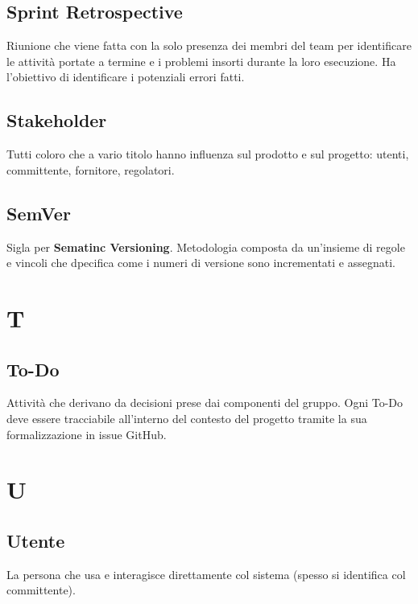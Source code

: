 \documentclass[a4paper,12pt]{article}
\begin{document}
\subsection*{Sprint Retrospective}
Riunione che viene fatta con la solo presenza dei membri del team per identificare le attività portate a termine e i problemi insorti durante la loro esecuzione.
Ha l'obiettivo di identificare i potenziali errori fatti.

\subsection*{Stakeholder}
Tutti coloro che a vario titolo hanno influenza sul prodotto e sul progetto: utenti, committente, fornitore, regolatori.

\subsection*{SemVer}
Sigla per \textbf{Sematinc Versioning}. Metodologia composta da un'insieme di regole e vincoli che dpecifica come i numeri di versione sono incrementati e assegnati.

\clearpage

\section{T}

\subsection*{To-Do}
Attività che derivano da decisioni prese dai componenti del gruppo. Ogni To-Do deve essere tracciabile all'interno del contesto del progetto tramite la sua formalizzazione in issue GitHub.

\clearpage

\section{U}

\subsection*{Utente}
La persona che usa e interagisce direttamente col sistema (spesso si identifica col committente).

\clearpage

\end{document}

